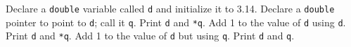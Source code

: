 Declare a \texttt{double} variable called \texttt{d} and initialize it to 3.14. Declare a \texttt{double} pointer to point to \texttt{d}; call it \texttt{q}. Print \texttt{d} and \texttt{*q}. Add 1 to the value of \texttt{d} using \texttt{d}. Print \texttt{d} and \texttt{*q}. Add 1 to the value of \texttt{d} but using \texttt{q}. Print \texttt{d} and \texttt{q}.

